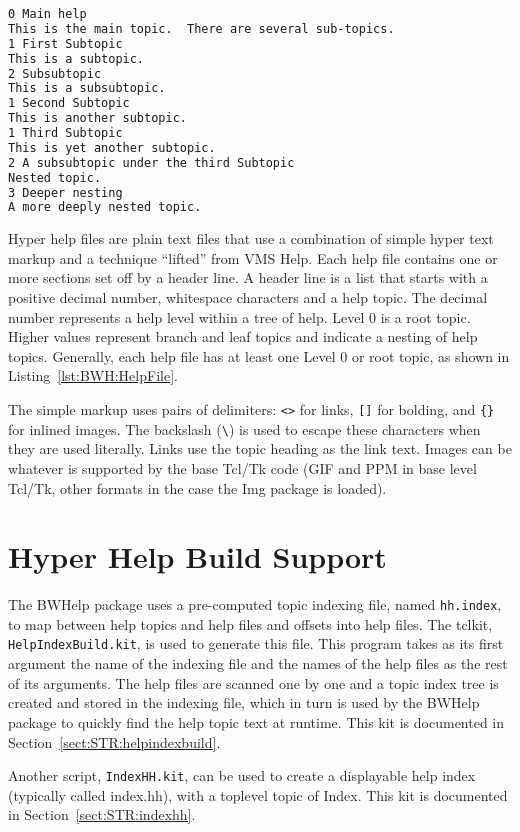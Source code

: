 \begin{lstlisting}[language=HTML,
		   caption={Typical help file},
		   label={lst:BWH:HelpFile}]
0 Main help
This is the main topic.  There are several sub-topics.
1 First Subtopic
This is a subtopic.
2 Subsubtopic
This is a subsubtopic.
1 Second Subtopic
This is another subtopic.
1 Third Subtopic
This is yet another subtopic.
2 A subsubtopic under the third Subtopic
Nested topic.
3 Deeper nesting
A more deeply nested topic.
\end{lstlisting}
Hyper help files are plain text files that use a combination of simple
hyper text markup and a technique ``lifted'' from VMS Help.  Each help
file contains one or more sections set off by a header line.  A header
line is a list that starts with a positive decimal number, whitespace
characters and a help topic.  The decimal number represents a help
level within a tree of help.  Level 0 is a root topic.  Higher values
represent branch and leaf topics and indicate a nesting of help topics.
Generally, each help file has at least one Level 0 or root topic, as
shown in Listing~\ref{lst:BWH:HelpFile}.

The simple markup uses pairs of delimiters: \verb=<>= for links,
\verb=[]= for bolding, and \verb={}= for inlined images.  The backslash
(\verb=\=) is used to escape these characters when they are used
literally.  Links use the topic heading as the link text.  Images can be
whatever is supported by the base Tcl/Tk code (GIF and PPM in base level
Tcl/Tk, other formats in the case the Img package is loaded).


\section{Hyper Help Build Support}
\label{sect:BWH:BuildIndex}

The BWHelp package uses a pre-computed topic indexing file, named
\verb=hh.index=, to map between help topics and help files and offsets
into help files.  The tclkit, \verb=HelpIndexBuild.kit=, is used to
generate this file.  This program takes as its first argument the name
of the indexing file and the names of the help files as the rest of its
arguments.  The help files are scanned one by one and a topic index
tree is created and stored in the indexing file, which in turn is used
by the BWHelp package to quickly find the help topic text at runtime.
This kit is documented in Section~\ref{sect:STR:helpindexbuild}.

Another script, \verb=IndexHH.kit=, can be used to create a displayable
help index (typically called index.hh), with a toplevel topic of Index.
This kit is documented in Section~\ref{sect:STR:indexhh}.

